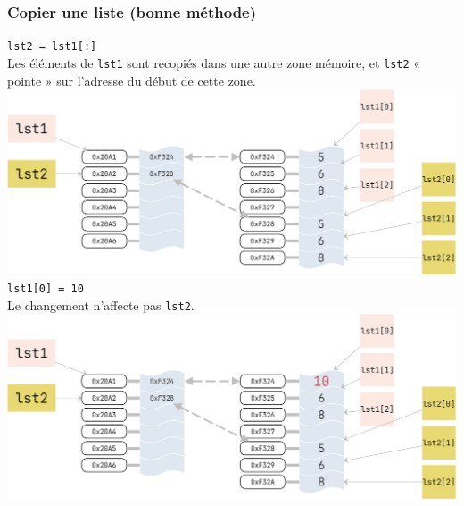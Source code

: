 \subsubsection{Copier une liste (bonne méthode)}



\texttt{lst2 = lst1[:]}\\

Les éléments de \texttt{lst1} sont recopiés dans une autre zone mémoire, et \texttt{lst2} « pointe » sur l'adresse du début de cette zone.\\
\includegraphics[width=\linewidth]{ch-listes/img/mut4.png}\\


\texttt{lst1[0] = 10}\\

Le changement n'affecte pas \texttt{lst2}.\\
\includegraphics[width=\linewidth]{ch-listes/img/mut5.png}